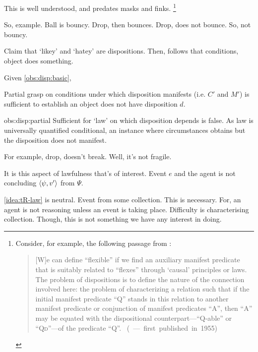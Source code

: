 \begin{note}
  This is well understood, and predates masks and finks.%
  \footnote{
    Consider, for example, the following passage from \citeauthor{Goodman:1983aa}:

    \begin{quote}
      [W]e can define ``flexible'' if we find an auxiliary manifest predicate that is suitably related to ``flexes'' through `causal' principles or laws.
      The problem of dispositions is to define the nature of the connection involved here:
      the problem of characterizing a relation such that if the initial manifest predicate ``Q'' stands in this relation to another manifest predicate or conjunction of manifest predicates ``A'', then ``A'' may be equated with the dispositional counterpart---``Q-able'' or ``Q\textsc{d}''---of the predicate ``Q''.\nolinebreak
      \mbox{ }\hfill\mbox{(\citeyear[45]{Goodman:1983aa} --- first published in 1955)}
    \end{quote}
  }
\end{note}


\begin{note}
  So, example.
  Ball is bouncy.
  Drop, then bounces.
  Drop, does not bounce.
  So, not bouncy.

  Claim that `likey' and `hatey' are dispositions.
  Then, follows that conditions, object does something.
\end{note}

\begin{note}
  \begin{observation}
    \label{obs:disp:partial}
    Given \autoref{obs:disp:basic},

    Partial grasp on conditions under which disposition manifests (i.e. \(C'\) and \(M'\)) is sufficient to establish an object does not have disposition \(d\).
  \end{observation}

  \begin{motivation}{obs:disp:partial}
    Sufficient for `law' on which disposition depends is false.
    As law is universally quantified conditional, an instance where circumstances obtains but the disposition does not manifest.
  \end{motivation}

  For example, drop, doesn't break.
  Well, it's not fragile.

  It is this aspect of lawfulness that's of interest.
  Event \(e\) and the agent is not concluding \(\langle \psi, v' \rangle\) from \(\Psi\).

  \autoref{idea:tR-law} is neutral.
  Event from some collection.
  This is necessary.
  For, an agent is not reasoning unless an event is taking place.
  Difficulty is characterising collection.
  Though, this is not something we have any interest in doing.
\end{note}


